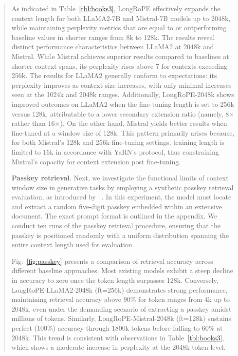 \begin{abstract}
As indicated in Table~\ref{tbl:books3}, LongRoPE effectively expands the context length for both LLaMA2-7B and Mistral-7B models up to 2048k, while maintaining perplexity metrics that are equal to or outperforming baseline values in shorter ranges from 8k to 128k. The results reveal distinct performance characteristics between LLaMA2 at 2048k and Mistral. While Mistral achieves superior results compared to baselines at shorter context spans, its perplexity rises above 7 for contexts exceeding 256k. The results for LLaMA2 generally conform to expectations: its perplexity improves as context size increases, with only minimal increases seen at the 1024k and 2048k ranges. Additionally, LongRoPE-2048k shows improved outcomes on LLaMA2 when the fine-tuning length is set to 256k versus 128k, attributable to a lower secondary extension ratio (namely, 8$\times$ rather than 16$\times$). On the other hand, Mistral yields better results when fine-tuned at a window size of 128k. This pattern primarily arises because, for both Mistral's 128k and 256k fine-tuning settings, training length is limited to 16k in accordance with YaRN's protocol, thus constraining Mistral’s capacity for context extension post fine-tuning.

\textbf{Passkey retrieval}. Next, we investigate the functional limits of context window size in generative tasks by employing a synthetic passkey retrieval evaluation, as introduced by ~\cite{passkey}. In this experiment, the model must locate and extract a random five-digit passkey embedded within an extensive document. The exact prompt format is outlined in the appendix. We conduct ten runs of the passkey retrieval procedure, ensuring that the passkey is positioned randomly with a uniform distribution spanning the entire context length used for evaluation.

Fig.~\ref{fig:passkey} presents a comparison of retrieval accuracy across different baseline approaches. Most existing models exhibit a steep decline in accuracy to zero once the token length surpasses 128k. Conversely, LongRoPE-LLaMA2-2048k (ft=256k) demonstrates strong performance, maintaining retrieval accuracy above 90\% for token ranges from 4k up to 2048k, even under the demanding scenario of extracting a passkey amidst millions of tokens. Similarly, LongRoPE-Mistral-2048k (ft=128k) sustains perfect (100\%) accuracy through 1800k tokens before falling to 60\% at 2048k. This trend is consistent with observations in Table~\ref{tbl:books3}, which shows a moderate increase in perplexity at the 2048k token level.


\end{abstract}
